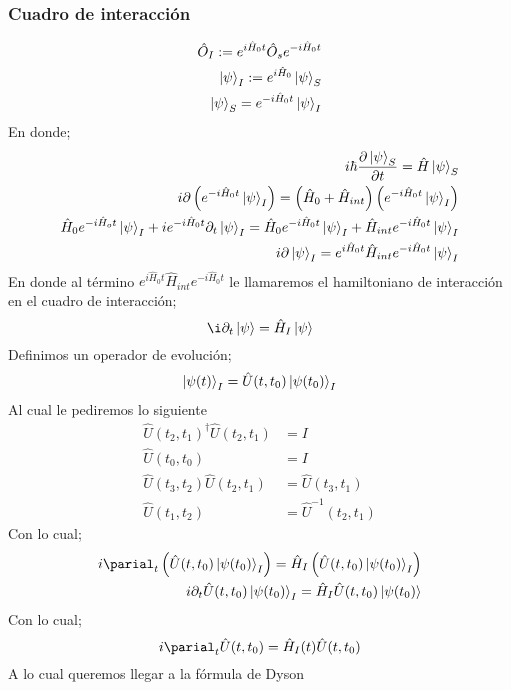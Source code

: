 \documentclass[../main.tex]{subfiles}
\begin{document}
 \subsubsection{Cuadro de interacción}
\begin{align*}
  \hat{O}_I := e^{i\hat{H}_0t}\hat{O}_s e^{-i\hat{H}_0t} \\
  \ket{\psi}_I := e^{i\hat{H}_0} \ket{\psi}_S \\
  \ket{\psi}_S  = e^{-i\hat{H}_0t}\ket{\psi}_I
\end{align*}
En donde;
\begin{align*}
  i\hbar \frac{\partial \ket{\psi}_S}{\partial t} = \hat{H}\ket{\psi}_S \\
  i \partial \left( e^{-i\hat{H}_0t} \ket{\psi}_I\right) = \left( \hat{H}_0 + \hat{H}_{int} \right) \left( e^{-i\hat{H}_0t} \ket{\psi}_I \right) \\
  \hat{H}_0 e^{-i\hat{H}_ot} \ket{\psi}_I + ie^{-i\hat{H}_0t}\partial_t \ket{\psi}_I = \hat{H}_0 e^{-i\hat{H}_0t} \ket{\psi}_I + \hat{H}_{int} e^{-i\hat{H}_0t}\ket{\psi}_I \\
  i\partial\ket{\psi}_I = e^{i\hat{H}_0t}\hat{H}_{int} e^{-i\hat{H}_0t} \ket{\psi}_I
\end{align*}
En donde al término $e^{i\hat{H}_0t}\hat{H}_{int}e^{-i\hat{H}_0t}$ le llamaremos el hamiltoniano de interacción en el cuadro de interacción;
\begin{equation}
  \i\partial_t \ket{\psi} = \hat{H}_I \ket{\psi}
 \end{equation}
 Definimos un operador de evolución;
 \begin{align*}
   \ket{\psi(t)}_I = \hat{U}(t,t_0) \ket{\psi(t_0)}_I
 \end{align*}
 Al cual le pediremos lo siguiente
 \begin{align}
   \hat{U}(t_2,t_1)^\dagger \hat{U}(t_2,t_1) &= I \\
   \hat{U}(t_0,t_0) & = I \\
   \hat{U}(t_3,t_2)\hat{U}(t_2,t_1) & = \hat{U}(t_3,t_1) \\
   \hat{U}(t_1,t_2) & = \hat{U}^{-1}(t_2,t_1)
 \end{align}
 Con lo cual;
 \begin{align*}
   i\parial_t \left(\hat{U}(t,t_0) \ket{\psi(t_0)}_I \right) = \hat{H}_I \left( \hat{U}(t,t_0)\ket{\psi(t_0)}_I \right) \\
   i\partial_t \hat{U}(t,t_0) \ket{\psi(t_0)}_I = \hat{H}_I \hat{U}(t,t_0) \ket{\psi(t_0)}
 \end{align*}
 Con lo cual;
 \begin{equation}
   i\parial_t \hat{U} (t,t_0) = \hat{H}_I(t) \hat{U}(t,t_0)
  \end{equation}
A lo cual queremos llegar a la fórmula de Dyson
\end{document}
